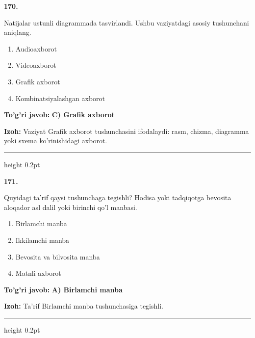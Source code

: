\documentclass[10pt,a4paper,oneside]{article}
\begin{document}
\noindent\textbf{\color{ink}170.}
\par
Natijalar ustunli diagrammada tasvirlandi. Ushbu vaziyatdagi asosiy tushunchani aniqlang.
\begin{enumerate}[label=\Alph*),leftmargin=9mm]
\item Audioaxborot
\item Videoaxborot
\item Grafik axborot
\item Kombinatsiyalashgan axborot
\end{enumerate}
\begin{tcolorbox}[enhanced,breakable,colback=teal!4,colframe=teal!50!black,boxrule=0.5pt,arc=1.1mm,left=3mm,right=3mm,top=1.7mm,bottom=1.7mm,before skip=2mm,after skip=2mm]
\textbf{\color{teal}To'g'ri javob:} \textbf{C) Grafik axborot}
\par\smallskip
\textbf{Izoh:} Vaziyat Grafik axborot tushunchasini ifodalaydi: rasm, chizma, diagramma yoki sxema ko'rinishidagi axborot.
\end{tcolorbox}
\vspace{2mm}\hrule height 0.2pt \vspace{3mm}

\noindent\textbf{\color{ink}171.}
\par
Quyidagi ta'rif qaysi tushunchaga tegishli? Hodisa yoki tadqiqotga bevosita aloqador asl dalil yoki birinchi qo'l manbasi.
\begin{enumerate}[label=\Alph*),leftmargin=9mm]
\item Birlamchi manba
\item Ikkilamchi manba
\item Bevosita va bilvosita manba
\item Matnli axborot
\end{enumerate}
\begin{tcolorbox}[enhanced,breakable,colback=teal!4,colframe=teal!50!black,boxrule=0.5pt,arc=1.1mm,left=3mm,right=3mm,top=1.7mm,bottom=1.7mm,before skip=2mm,after skip=2mm]
\textbf{\color{teal}To'g'ri javob:} \textbf{A) Birlamchi manba}
\par\smallskip
\textbf{Izoh:} Ta'rif Birlamchi manba tushunchasiga tegishli.
\end{tcolorbox}
\vspace{2mm}\hrule height 0.2pt \vspace{3mm}
\end{document}
